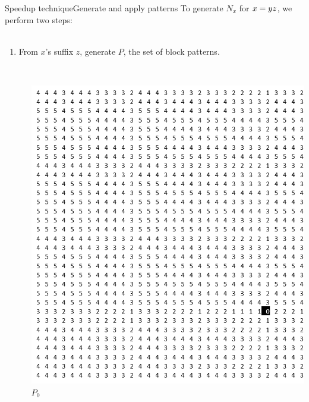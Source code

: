 \documentclass[pdf,xcolor={dvipsnames}]{beamer}
\begin{document}
	\begin{frame}{Speedup technique}{Generate and apply patterns}
		To generate $N_x$ for $x={\color{black}y}{\color{black}z}$, we perform two steps:\\\ \\
		\begin{enumerate}
		\item From {\color{black} $x$}'s suffix $z$, generate $P$, the set of block patterns.\\\ \\
		\begin{columns}
			\begin{column}{0.12\textwidth}\end{column}
			\begin{column}{0.12\textwidth}\includegraphics[width=\textwidth]{img/0}\\ \centering $P_0$ \end{column}

\end{columns}
\end{enumerate}
\end{frame}
\end{document}
